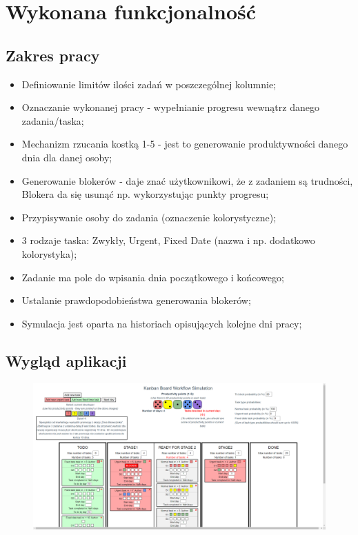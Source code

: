 \documentclass{article}
\begin{document}
\section{Wykonana funkcjonalność}

\subsection{Zakres pracy}
\begin{itemize}
    \item Definiowanie limitów ilości zadań w poszczególnej kolumnie;
    \item Oznaczanie wykonanej pracy - wypełnianie progresu wewnątrz danego zadania/taska;
    \item Mechanizm rzucania kostką 1-5 - jest to generowanie produktywności danego dnia dla danej osoby;
    \item Generowanie blokerów - daje znać użytkownikowi, że z zadaniem są trudności, Blokera da się usunąć np. wykorzystując punkty progresu;
    \item Przypisywanie osoby do zadania (oznaczenie kolorystyczne);
    \item 3 rodzaje taska: Zwykły, Urgent, Fixed Date (nazwa i np. dodatkowo kolorystyka);
    \item Zadanie ma pole do wpisania dnia początkowego i końcowego;
    \item Ustalanie prawdopodobieństwa generowania blokerów;
    \item Symulacja jest oparta na historiach opisujących kolejne dni pracy;
\end{itemize}

\clearpage

\subsection{Wygląd aplikacji}

    \begin{figure} [hbt!]
        \centering
        \includegraphics[width=16cm]{img/wygląd strony.PNG}
    \end{figure}
\end{document}
